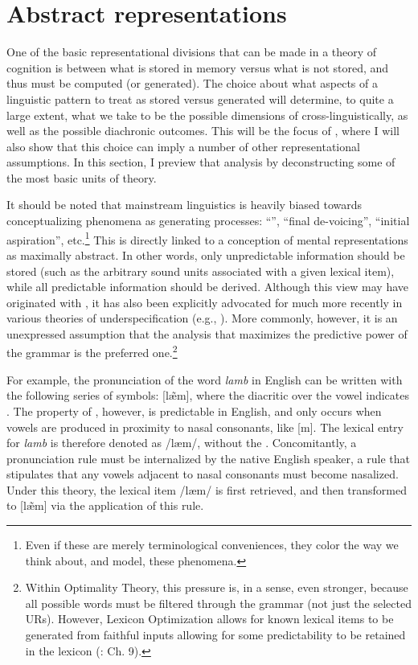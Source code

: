 \section{Abstract representations}\largerpage

One of the basic representational divisions that can be made in a
theory of cognition is between what is stored in memory versus what
is not stored, and thus must be computed (or generated). The choice
about what aspects of a linguistic pattern to treat as stored versus
generated will determine, to quite a large extent, what we take to
be the possible dimensions of  cross-linguistically,
as well as the possible diachronic outcomes. This will be the focus
of , where I will also show that
this choice can imply a number of other representational assumptions.
In this section, I preview that analysis by deconstructing some of
the most basic units of  theory.

It should be noted that mainstream  linguistics is heavily
biased towards conceptualizing phenomena as generating processes:
“”, “final de-voicing”, “initial
aspiration”, etc.\footnote{Even if these are merely terminological conveniences, they color the
way we think about, and model, these phenomena.} This is directly linked to a conception of mental representations
as maximally abstract. In other words, only unpredictable information
should be stored (such as the arbitrary sound units associated with
a given lexical item), while all predictable information should be
derived. Although this view may have originated with \citet{Chomsky1968},
it has also been explicitly advocated for much more recently in various
theories of underspecification (e.g., \citealt{archangeli1988aspects,Steriade1995a}).
More commonly, however, it is an unexpressed assumption that the analysis
that maximizes the predictive power of the grammar is the preferred
one.\footnote{Within Optimality Theory, this pressure is, in a sense, even stronger,
because all possible words must be filtered through the grammar (not
just the selected URs). However, Lexicon Optimization allows for known
lexical items to be generated from faithful inputs allowing for some
predictability to be retained in the lexicon (\citealt{Prince2004}:
Ch. 9). }

For example, the pronunciation of the word \textit{lamb} in English
can be written with the following series of  symbols: {[læ̃m]},
where the diacritic over the vowel indicates . The property
of , however, is predictable in English, and only occurs
when vowels are produced in proximity to nasal consonants, like {[}m{]}.
The lexical entry for \textit{lamb} is therefore denoted as {/læm/},
without the . Concomitantly, a pronunciation rule must
be internalized by the native English speaker, a rule that stipulates
that any vowels adjacent to nasal consonants must become nasalized.
Under this theory, the lexical item {/læm/} is first retrieved,
and then transformed to {[læ̃m]} via the application of
this rule. 

